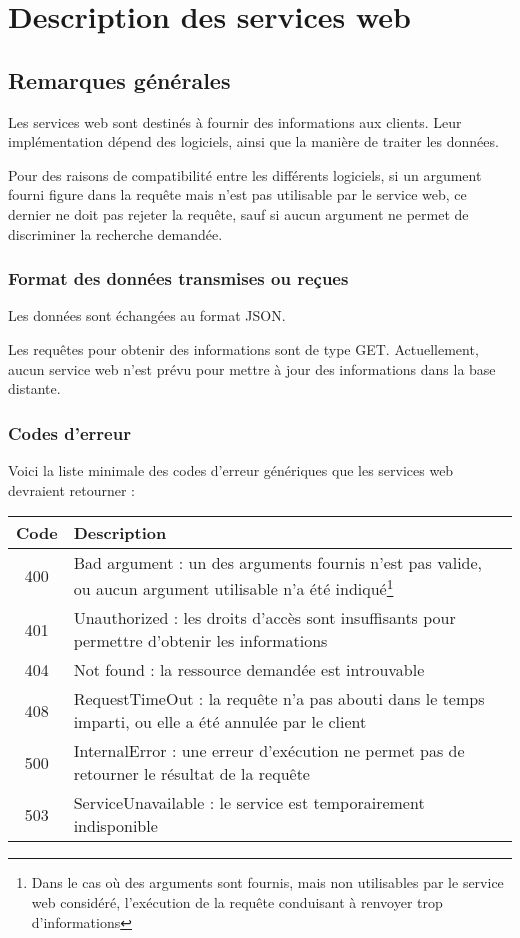 \chapter{Description des services web}

\section{Remarques générales}

Les services web sont destinés à fournir des informations aux clients. Leur implémentation dépend des logiciels, ainsi que la manière de traiter les données.

Pour des raisons de compatibilité entre les différents logiciels, si un argument fourni figure dans la requête mais n'est pas utilisable par le service web, ce dernier ne doit pas rejeter la requête, sauf si aucun argument ne permet de discriminer la recherche demandée.

\subsection{Format des données transmises ou reçues}
Les données sont échangées au format JSON.

Les requêtes pour obtenir des informations sont de type GET. Actuellement, aucun service web n'est prévu pour mettre à jour des informations dans la base distante.

\subsection{Codes d'erreur}

Voici la liste minimale des codes d'erreur génériques que les services web devraient retourner :
\begin{longtable}{|c|>{\raggedright\arraybackslash}p{10cm}|}
\hline 
Code &  Description \\ 
\hline \endhead
400 & Bad argument : un des arguments fournis n'est pas valide, ou aucun argument utilisable n'a été indiqué\footnote{Dans le cas où des arguments sont fournis, mais non utilisables par le service web considéré, l'exécution de la requête conduisant à renvoyer trop d'informations} \\
\hline
401 & Unauthorized : les droits d'accès sont insuffisants pour permettre d'obtenir les informations \\
\hline
404 & Not found : la ressource demandée est introuvable\\
\hline
408 & RequestTimeOut : la requête n'a pas abouti dans le temps imparti, ou elle a été annulée par le client\\
\hline
500 & InternalError : une erreur d'exécution ne permet pas de retourner le résultat de la requête\\
\hline
503 & ServiceUnavailable : le service est temporairement indisponible\\
\hline
\end{longtable} 

